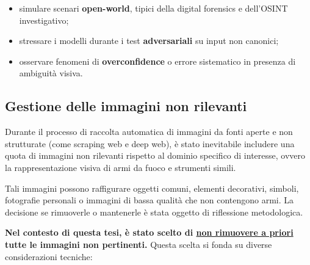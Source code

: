 \begin{itemize}
    \item simulare scenari \textbf{open-world}, tipici della digital forensics e dell’OSINT investigativo;
    \item stressare i modelli durante i test \textbf{adversariali} su input non canonici;
    \item osservare fenomeni di \textbf{overconfidence} o errore sistematico in presenza di ambiguità visiva.
\end{itemize}


\vspace{0.5cm}








\subsection*{Gestione delle immagini non rilevanti}
Durante il processo di raccolta automatica di immagini da fonti aperte e non strutturate (come scraping web e deep web), è stato inevitabile includere una quota di immagini non rilevanti rispetto al dominio specifico di interesse, ovvero la rappresentazione visiva di armi da fuoco e strumenti simili.

Tali immagini possono raffigurare oggetti comuni, elementi decorativi, simboli, fotografie personali o immagini di bassa qualità che non contengono armi. La decisione se rimuoverle o mantenerle è stata oggetto di riflessione metodologica.

\textbf{Nel contesto di questa tesi, è stato scelto di \underline{non rimuovere a priori} tutte le immagini non pertinenti.} Questa scelta si fonda su diverse considerazioni tecniche:

